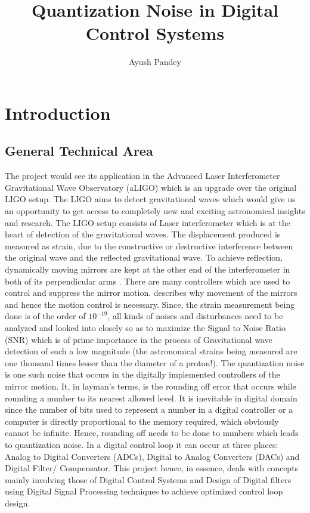 \documentclass[colorlinks=true,pdfstartview=FitV,linkcolor=blue,
            citecolor=red,urlcolor=magenta]{ligodoc}
\title{Quantization Noise in Digital Control Systems}
\author{Ayush Pandey}
\begin{document}
 \section{Introduction}
    \subsection{General Technical Area}
The project would see its application in the Advanced Laser Interferometer Gravitational Wave Observatory (aLIGO) which is an upgrade over the original LIGO \cite{LIGO} setup. The LIGO aims to detect gravitational waves \cite{GWD} which would give us an opportunity to get access to completely new and exciting astronomical insights and research. The LIGO setup consists of Laser interferometer \cite{Interferometer} which is at the heart of detection of the gravitational waves. The displacement produced is measured as strain, due to the constructive or destructive interference between the original wave and the reflected gravitational wave. To achieve reflection, dynamically moving mirrors are kept at the other end of the interferometer in both of its perpendicular arms \cite{Interferometer}. There are many controllers which are used to control and suppress the mirror motion. \cite{Control} describes why movement of the mirrors and hence the motion control is necessary. Since, the strain measurement being done is of the order of $10^{-19}$, all kinds of noises and disturbances need to be analyzed and looked into closely so as to maximize the Signal to Noise Ratio (SNR) which is of prime importance in the process of Gravitational wave detection of such a low magnitude (the astronomical strains being measured are one thousand times lesser than the diameter of a proton!). The quantization noise is one such noise that occurs in the digitally implemented controllers of the mirror motion. It, in layman's terms, is the rounding off error that occurs while rounding a number to its nearest allowed level. It is inevitable in digital domain since the number of bits used to represent a number in a digital controller or a computer is directly proportional to the memory required, which obviously cannot be infinite. Hence, rounding off needs to be done to numbers which leads to quantization noise. In a digital control loop it can occur at three places: Analog to Digital Converters (ADCs),
Digital to Analog Converters (DACs) and
Digital Filter/ Compensator.
This project hence, in essence, deals with concepts mainly involving those of Digital Control Systems and Design of Digital filters using Digital Signal Processing  techniques to achieve optimized control loop design.
\end{document}
